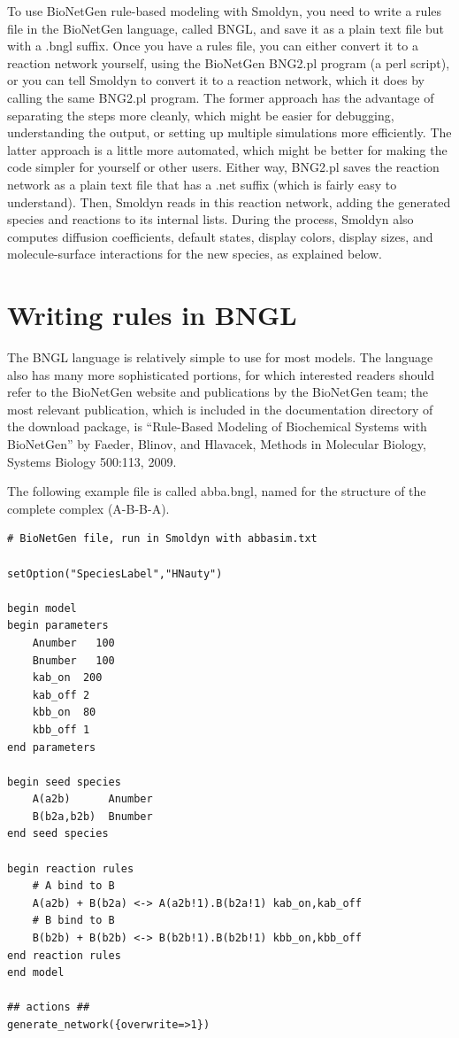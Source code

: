 \documentclass {book}
\begin{document}
To use BioNetGen rule-based modeling with Smoldyn, you need to write a rules file in the BioNetGen language, called BNGL, and save it as a plain text file but with a .bngl suffix. Once you have a rules file, you can either convert it to a reaction network yourself, using the BioNetGen BNG2.pl program (a perl script), or you can tell Smoldyn to convert it to a reaction network, which it does by calling the same BNG2.pl program. The former approach has the advantage of separating the steps more cleanly, which might be easier for debugging, understanding the output, or setting up multiple simulations more efficiently. The latter approach is a little more automated, which might be better for making the code simpler for yourself or other users. Either way, BNG2.pl saves the reaction network as a plain text file that has a .net suffix (which is fairly easy to understand). Then, Smoldyn reads in this reaction network, adding the generated species and reactions to its internal lists. During the process, Smoldyn also computes diffusion coefficients, default states, display colors, display sizes, and molecule-surface interactions for the new species, as explained below.

\section{Writing rules in BNGL}

The BNGL language is relatively simple to use for most models. The language also has many more sophisticated portions, for which interested readers should refer to the BioNetGen website and publications by the BioNetGen team; the most relevant publication, which is included in the documentation directory of the download package, is ``Rule-Based Modeling of Biochemical Systems with BioNetGen'' by Faeder, Blinov, and Hlavacek, Methods in Molecular Biology, Systems Biology 500:113, 2009.

The following example file is called abba.bngl, named for the structure of the complete complex (A-B-B-A).

\begin{lstlisting}[style=SSAC]
# BioNetGen file, run in Smoldyn with abbasim.txt

setOption("SpeciesLabel","HNauty")

begin model
begin parameters
	Anumber   100
	Bnumber   100
	kab_on	200
	kab_off	2
	kbb_on	80
	kbb_off	1
end parameters

begin seed species
	A(a2b)		Anumber
	B(b2a,b2b)	Bnumber
end seed species

begin reaction rules
	# A bind to B
	A(a2b) + B(b2a) <-> A(a2b!1).B(b2a!1) kab_on,kab_off
	# B bind to B
	B(b2b) + B(b2b) <-> B(b2b!1).B(b2b!1) kbb_on,kbb_off
end reaction rules
end model

## actions ##
generate_network({overwrite=>1})
\end{lstlisting}
\end{document}
